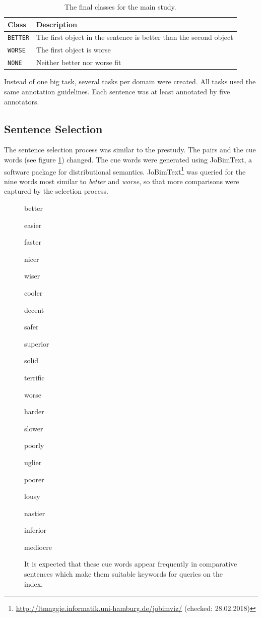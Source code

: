 \begin{table}[h]
\centering
\caption{The final classes for the main study.}
\label{tbl:mainstudy-classes}
\begin{tabular}{@{}ll@{}}
\toprule
Class & Description \\ \midrule
\texttt{BETTER} & The first object in the sentence is better than the second object\\
\texttt{WORSE} & The first object is worse \\
\texttt{NONE} & Neither better nor worse fit\\
\bottomrule
\end{tabular}
\end{table}

Instead of one big task, several tasks per domain were created. All tasks used the same annotation guidelines. Each sentence was at least annotated by five annotators.


\subsection{Sentence Selection}
The sentence selection process was similar to the prestudy. The pairs and the cue words (see figure \ref{fig:cue_words}) changed. The cue words were generated using JoBimText, a software package for distributional semantics. JoBimText\footnote{\url{http://ltmaggie.informatik.uni-hamburg.de/jobimviz/} (checked: 28.02.2018)} was queried for the nine words most similar to \emph{better} and \emph{worse}, so that more comparisons were captured by the selection process.

\begin{figure}[hb]
\centering
\caption{It is expected that these cue words appear frequently in comparative sentences which make them suitable keywords for queries on the index.}
\label{fig:cue_words}
\begin{multicols}{4}
better

easier

faster

nicer

wiser

cooler

decent

safer

superior

solid

terrific

worse

harder

slower

poorly

uglier

poorer

lousy

nastier

inferior

mediocre
\end{multicols}
\end{figure}

